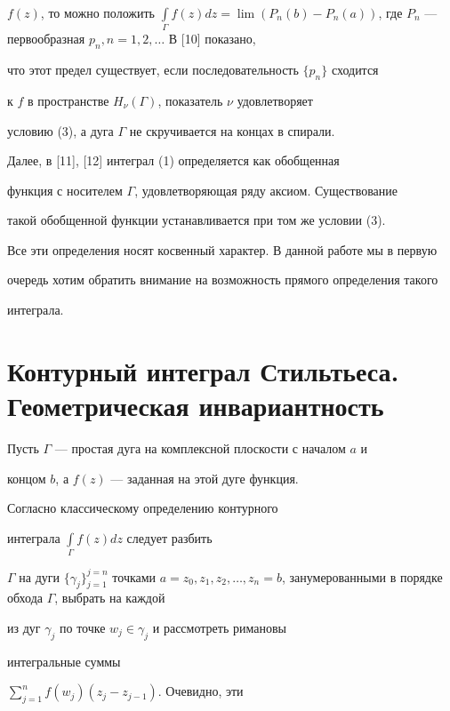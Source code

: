 $f(z)$, то можно положить $\int\limits_{\Gamma}{f(z)dz} =\lim (P_{n}(b) -


P_{n}(a))$, где $P_n$ --- первообразная $p_n, n=1,2,\dotsc$ В [10] показано,


что этот предел существует, если последовательность $\{p_n\}$ сходится


к $f$ в пространстве $H_{\nu}(\Gamma)$, показатель $\nu$ удовлетворяет


условию (3), а дуга $\Gamma$ не скручивается на концах в спирали.





Далее, в [11], [12] интеграл (1) определяется как обобщенная


функция с носителем $\Gamma$, удовлетворяющая ряду аксиом. Существование


такой обобщенной функции устанавливается при том же условии (3).





Все эти определения носят косвенный характер. В данной работе мы в первую


очередь хотим обратить внимание на возможность прямого определения такого


интеграла.





\section {Контурный интеграл Стильтьеса. Геометрическая инвариантность}





Пусть $\Gamma$ --- простая дуга на комплексной плоскости с началом $a$ и


концом $b$, а $f(z)$ --- заданная на этой дуге функция.


Согласно классическому определению контурного 


интеграла $\int\limits_{\Gamma}{f(z)dz}$ следует разбить


$\Gamma$ на дуги $\{\gamma_j\}_{j=1}^{j=n}$ точками $a = z_0, z_1, z_2,


\dotsc, z_n = b$, занумерованными в порядке обхода $\Gamma$, выбрать на каждой


из дуг $\gamma_j$ по точке $w_j \in\gamma_j$ и рассмотреть римановы


интегральные суммы


$\sum\limits_{j=1}^{n} f(w_j)(z_j - z_{j-1})$. Очевидно, эти


